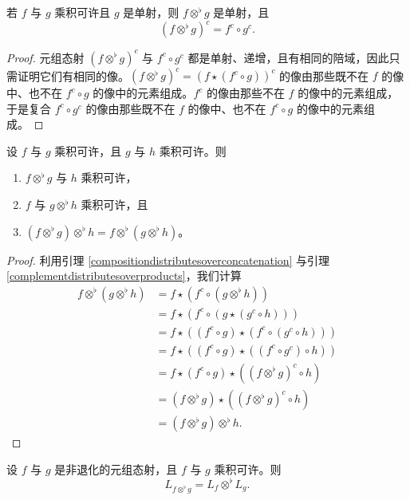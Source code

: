 \begin{lemma}\label{complementdistributesoverproducts}
    若 $f$ 与 $g$ 乘积可许且 $g$ 是单射，则 $f \otimes^\flat g$ 是单射，且
    \[
    (f \otimes^\flat g)^c = f^c \circ g^c.
    \]
\end{lemma}
\begin{proof}
    元组态射 $(f \otimes^\flat g)^c$ 与 $f^c \circ g^c$ 都是单射、递增，且有相同的陪域，因此只需证明它们有相同的像。$(f \otimes^\flat g)^c = (f \star (f^c \circ g) )^c$ 的像由那些既不在 $f$ 的像中、也不在 $f^c \circ g$ 的像中的元素组成。$f^c$ 的像由那些不在 $f$ 的像中的元素组成，于是复合 $f^c \circ g^c$ 的像由那些既不在 $f$ 的像中、也不在 $f^c \circ g$ 的像中的元素组成。 
\end{proof}

\begin{proposition}
    设 $f$ 与 $g$ 乘积可许，且 $g$ 与 $h$ 乘积可许。则
    \begin{enumerate}
        \item $f \otimes^\flat g$ 与 $h$ 乘积可许，
        \item $f$ 与 $g \otimes^\flat h$ 乘积可许，且
        \item $(f \otimes^\flat g) \otimes^\flat h = f \otimes^\flat (g \otimes^\flat h)$。
    \end{enumerate}
\end{proposition}

\begin{proof}
    利用引理 \ref{compositiondistributesoverconcatenation} 与引理 \ref{complementdistributesoverproducts}，我们计算 
    \begin{align*}
    f \otimes^\flat (g \otimes^\flat h) & = f \star (f^c \circ (g \otimes^\flat h))\\
    & = f \star (f^c \circ (g \star (g^c \circ h) ) )\\
    & = f \star ( (f^c \circ g) \star (f^c \circ (g^c \circ h) ) ) \\
    & = f \star ( (f^c \circ g) \star ((f^c \circ g^c) \circ h ) ) \\
    & = f \star (f^c \circ g) \star ( (f \otimes^\flat g)^c \circ h) \\
    & = (f \otimes^\flat g) \star ( (f \otimes^\flat g)^c \circ h) \\
    & = (f \otimes^\flat g) \otimes^\flat h.
    \end{align*} 
\end{proof}



\begin{proposition}
    设 $f$ 与 $g$ 是非退化的元组态射，且 $f$ 与 $g$ 乘积可许。则
    \[
    L_{f \otimes^\flat g} = L_f \otimes^\flat L_g.
    \]
\end{proposition}

